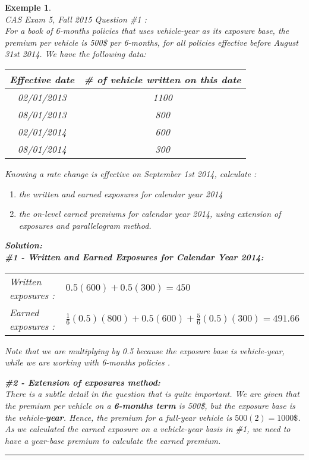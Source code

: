 \documentclass[11pt, english]{memoir}
\numberwithin{definition}{section}
\newtheorem{example}{Exemple}[section]
\newenvironment{exemple}
{
	\begin{example} \normalfont \ \\[5pt] 
	}
	{
		\hfill\rule{0.5em}{0.5em}\end{example}
}
\newenvironment{solution}
{\noindent\textbf{Solution:} \\[5pt] 
}{
}
\begin{document}
	\begin{exemple}
		CAS Exam 5, Fall 2015 Question \#1 : \\
		For a book of 6-months policies that uses vehicle-year as its exposure base, the premium per vehicle is 500\$ per 6-months, for all policies effective before August 31st 2014. We have the following data: 
		
		\begin{tabular}{cc}
			\toprule
			Effective date & \# of vehicle written on this date\\
			\midrule
			02/01/2013 & 1100\\
			08/01/2013 & 800 \\
			02/01/2014 & 600 \\
			08/01/2014 & 300
		\end{tabular}
	
	Knowing a rate change is effective on September 1st 2014, calculate : 
	\begin{enumerate}
		\item the written and earned exposures for calendar year 2014
		\item the on-level earned premiums for calendar year 2014, using extension of exposures and parallelogram method. 
	\end{enumerate}

	\begin{solution}
		\textbf{\#1 -  Written and Earned Exposures for Calendar Year 2014:}
		
		\begin{tabular}{ll}
			Written exposures : & $ 0.5(600) + 0.5(300) = 450 $\\
			Earned exposures : & $ \frac{1}{6}(0.5)(800) + 0.5(600) + \frac{5}{6}(0.5)(300) = 491.66 $
		\end{tabular}
	
		\small *Note that we are multiplying by 0.5 because the exposure base is vehicle-year, while we are working with 6-months policies .\normalsize
		
		\textbf{\#2 - Extension of exposures method: }\\[0pt]
			There is a subtle detail in the question that is quite important. We are given that the premium per vehicle on a \textbf{6-months term} is 500\$, but the exposure base is the vehicle-\textbf{year}. Hence, the premium for a full-year vehicle is $ 500(2) = 1000\$ $. As we calculated the earned exposure on a vehicle-year basis in \#1, we need to have a year-base premium to calculate the earned premium. 
			

\end{solution}
\end{exemple}
\end{document}
